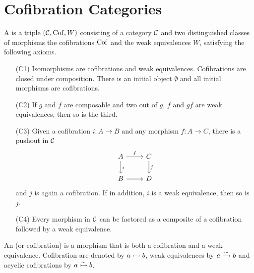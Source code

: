 
\section{Cofibration Categories}


\begin{definition}
A  is a triple $(\mathcal{C},\operatorname{Cof},W)$ consisting of a category $\mathcal{C}$ and two distinguished classes of morphisms the cofibrations $\operatorname{Cof}$ and the weak equivalences $W$, satisfying the following axioms.
\begin{itemize}
    \item[(C1)] Isomorphisms are cofibrations and weak equivalences. Cofibrations are closed under composition. There is an initial object $\emptyset$ and all initial morphisms are cofibrations.
    \item[(C2)] If $g$ and $f$ are composable and two out of $g$, $f$ and $gf$ are weak equivalences, then so is the third.
    \item[(C3)] Given a cofibration $i:A\to B$ and any morphism $f:A\to C$, there is a pushout in $\mathcal{C}$
    \[
    \begin{tikzcd}
    A \ar[d,"i"] \ar[r,"f"] & C \ar[d,"j"]\\
    B \ar[r] & D
    \end{tikzcd}
    \]
    and $j$ is again a cofibration. If in addition, $i$ is a weak equivalence, then so is $j$.
    \item[(C4)] Every morphism in $\mathcal{C}$ can be factored as a composite of a cofibration followed by a weak equivalence.
\end{itemize}

An  (or  cofibration) is a morphism that is both a cofibration and a weak equivalence. Cofibration are denoted by $a\rightarrowtail b$, weak equivalences by $a\xrightarrow{\sim}b$ and acyclic cofibrations by $a\acco b$.
\end{definition}

